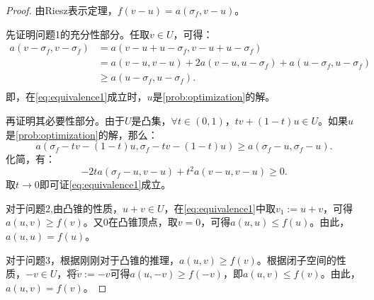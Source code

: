 \documentclass[lang=cn,10pt,newtx]{elegantbook}
\begin{document}
\begin{proof}
  由Riesz表示定理，$f(v-u)=a(\sigma_{f},v-u)$。

  先证明问题1的充分性部分。任取$v\in U$，可得：
  \begin{equation}
    \begin{aligned}
      a(v-\sigma_{f},v-\sigma_{f})&=a(v-u+u-\sigma_{f},v-u+u-\sigma_{f})\\
      &=a(v-u,v-u)+2a(v-u,u-\sigma_{f})+a(u-\sigma_{f},u-\sigma_{f})\\
      &\ge a(u-\sigma_{f},u-\sigma_{f}).\\
    \end{aligned}
  \end{equation}
  即，在\eqref{eq:equivalence1}成立时，$u$是\ref{prob:optimization}的解。

  再证明其必要性部分。由于$U$是凸集，$\forall t\in(0,1)$，$tv+(1-t)u\in U$。如果$u$是\ref{prob:optimization}的解，那么：
  \begin{equation}
    a(\sigma_{f}-tv-(1-t)u,\sigma_{f}-tv-(1-t)u)\ge a(\sigma_{f}-u,\sigma_{f}-u).
  \end{equation}
  化简，有：
  \begin{equation}
    -2ta(\sigma_{f}-u,v-u)+t^2a(v-u,v-u)\ge 0.
  \end{equation}
  取$t\rightarrow 0$即可证\eqref{eq:equivalence1}成立。

  对于问题2,由凸锥的性质，$u+v\in U$，在\eqref{eq:equivalence1}中取$v_{1}:=u+v$，可得$a(u,v)\ge f(v)$。又$0$在凸锥顶点，取$v=0$，可得$a(u,u)\le f(u)$。由此，$a(u,u)=f(u)$。

  对于问题3，根据刚刚对于凸锥的推理，$a(u,v)\ge f(v)$。根据闭子空间的性质，$-v\in U$，将$\tilde{v}:=-v$可得$a(u,-v)\ge f(-v)$，即$a(u,v)\le f(v)$。由此，$a(u,v)=f(v)$。
\end{proof}
\end{document}
